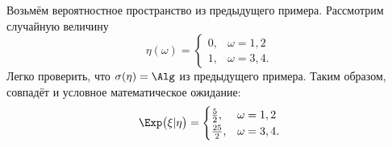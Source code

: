     \begin{exmp}
        Возьмём вероятностное пространство из предыдущего примера.
        Рассмотрим случайную величину 
        \begin{equation*}
            \eta(\omega) = \begin{cases} 
                0, & \omega = 1, 2 \\
                1, & \omega = 3, 4. 
            \end{cases}
        \end{equation*}
        Легко проверить, что $\sigma(\eta) = \Alg$ из предыдущего примера. 
        Таким образом, совпадёт и условное математическое ожидание:
        \begin{equation*}
            \Exp \bigl( \xi | \eta \bigr) = \begin{cases}
                \frac{5}{2}, & \omega = 1, 2\\
                \frac{25}{2}, & \omega = 3, 4.
            \end{cases}
        \end{equation*}
    \end{exmp}        

